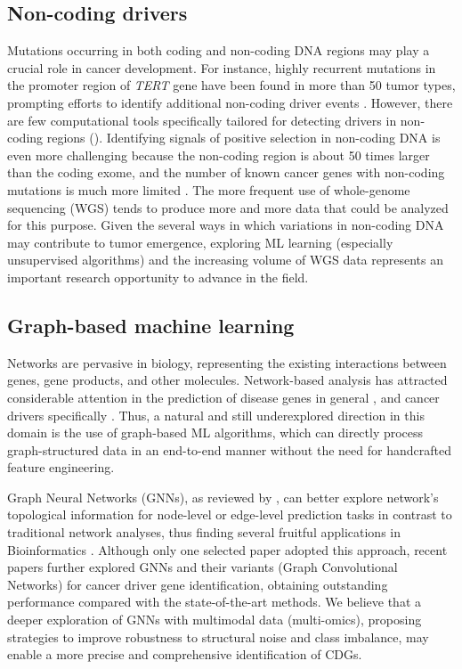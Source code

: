 \subsection{Non-coding drivers}

Mutations occurring in both coding and non-coding DNA regions may play a crucial role in cancer development. For instance, highly recurrent mutations in the promoter region of \textit{TERT} gene have been found in more than 50 tumor types, prompting efforts to identify additional non-coding driver events \cite{elliott2021non, bell2016understanding}. However, there are few computational tools specifically tailored for detecting drivers in non-coding regions (\eg \cite{funseq2, lawrence2013mutational, guo2020mutspot}). Identifying signals of positive selection in non-coding DNA is even more challenging because the non-coding region is about 50 times larger than the coding exome, and the number of known cancer genes with non-coding mutations is much more limited \cite{belkadi2015whole, elliott2021non}. The more frequent use of whole-genome sequencing (WGS) tends to produce more and more data that could be analyzed for this purpose. Given the several ways in which variations in non-coding DNA may contribute to tumor emergence, exploring ML learning (especially unsupervised algorithms) and the increasing volume of WGS data represents an important research opportunity to advance in the field.

\subsection{Graph-based machine learning}



Networks are pervasive in biology, representing the existing interactions between genes, gene products, and other molecules. Network-based analysis has attracted considerable attention in the prediction of disease genes in general \cite{ata2021recent}, and cancer drivers specifically \cite{zhang2016discovery, dimitrakopoulos2017computational}.
Thus, a natural and still underexplored direction in this domain is the use of graph-based ML algorithms, which can directly process graph-structured data in an end-to-end manner without the need for handcrafted feature engineering.

Graph Neural Networks (GNNs), as reviewed by \citet{wu2020comprehensive}, can better explore network's topological information for node-level or edge-level prediction tasks in contrast to traditional network analyses, thus finding several fruitful applications in Bioinformatics \cite{zhang2021graph}. Although only one selected paper adopted this approach, recent papers \cite{schulte2021integration, peng2021improving} further explored GNNs and their variants (\eg Graph Convolutional Networks) for cancer driver gene identification, obtaining outstanding performance compared with the state-of-the-art methods. 
We believe that a deeper exploration of GNNs with multimodal data (\eg multi-omics), proposing strategies to improve robustness to structural noise and class imbalance, may enable a more precise and comprehensive identification of CDGs.


